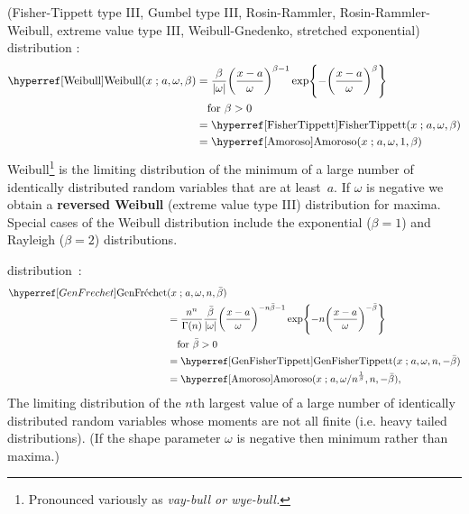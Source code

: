 (Fisher-Tippett type III, Gumbel type III, Rosin-Rammler, Rosin-Rammler-Weibull, extreme value type III, Weibull-Gnedenko, stretched exponential) distribution \cite{Weibull1951,Johnson1995}: 
\begin{align}
\label{Weibull}
\opr{Weibull}(x \given a ,\omega, \beta) 
&=	\frac{\beta}{| \omega |} \Left(\frac{x-a }{\omega}\Right)^{\beta-1} \exp\Left\{-\Left(\frac{x-a }{\omega}\Right)^{\beta}\Right\}  \checked
\\ \notag &\quad \text{for } \beta>0 
\\ \notag
& = \opr{FisherTippett}(x\given  a, \omega, \beta) \checked
\\ \notag
&= \opr{Amoroso}(x\given  a , \omega, 1, \beta)  \checked
\end{align}
Weibull\footnote{Pronounced variously as \sl{vay-bull} or \sl{wye-bull}.} is the limiting distribution of the minimum of a large number of  identically distributed random variables that are at least~$a$.  If $\omega$ is negative we obtain a {\bf reversed Weibull} (extreme value type III) distribution for maxima.
Special cases of the Weibull distribution include the exponential ($\beta=1$) and Rayleigh ($\beta=2$)  distributions.

 distribution~\cite{Smirnov1949,Barndorff-Nielsen1963}:
\begin{align}
\label{GenFrechet}
\GenFrechet&(x \given a , \omega, n, \bar{\beta}) 
\\
 \notag 
&=	\frac{n^n}{\Gamma(n)}  \frac{\bar{\beta}}{| \omega |} \Left(\frac{x-a }{\omega}\Right)^{-n\bar{\beta}-1} 
\exp\Left\{-n\Left(\frac{x-a }{\omega}\Right)^{-\bar{\beta}}\Right\} 
\checked
\\ &\quad \text{for } \bar{\beta}>0  \notag
\\ \notag
& = \opr{GenFisherTippett}(x\given a, \omega, n, -\bar{\beta})
\checked
\\ \notag
&= \opr{Amoroso}(x\given  a , {\omega}/{n^{\frac{1}{\beta} }},n,-\bar{\beta}),
\checked
\end{align}
The limiting distribution of the $n$th largest value of a large number of identically distributed random variables whose moments are not all finite (i.e. heavy tailed distributions).  (If the shape parameter $\omega$ is negative then minimum rather than maxima.)


